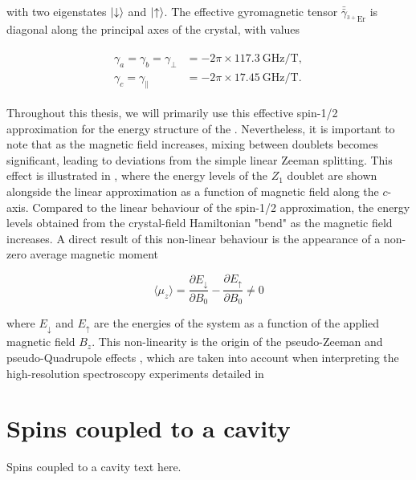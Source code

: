 with two eigenstates $\ket{\downarrow}$ and $\ket{\uparrow}$. The effective gyromagnetic tensor $\bar{\bar{\gamma}}_{^{3+}\text{Er}}$ is diagonal along the principal axes of the crystal, with values 

\begin{align}
\begin{split}
    \gamma_a = \gamma_b = \gamma_\perp &= -2\pi \times 117.3~\text{GHz/T}, \\
    \gamma_c = \gamma_\parallel &= -2\pi \times 17.45~\text{GHz/T}.
\end{split}
\end{align}

Throughout this thesis, we will primarily use this effective spin-1/2 approximation for the energy structure of the \Er. Nevertheless, it is important to note that as the magnetic field increases, mixing between doublets becomes significant, leading to deviations from the simple linear Zeeman splitting. This effect is illustrated in , where the energy levels of the $Z_1$ doublet are shown alongside the linear approximation as a function of magnetic field along the $c$-axis. Compared to the linear behaviour of the spin-1/2 approximation, the energy levels obtained from the crystal-field Hamiltonian "bend" as the magnetic field increases. A direct result of this non-linear behaviour is the appearance of a non-zero average magnetic moment

\begin{equation}
    \langle \mu_z \rangle = \frac{\partial E_\downarrow}{\partial B_0} - \frac{\partial E_\uparrow}{\partial B_0} \neq 0
\end{equation}

where $E_\downarrow$ and $E_\uparrow$ are the energies of the system as a function of the applied magnetic field $B_z$. This non-linearity is the origin of the pseudo-Zeeman  and pseudo-Quadrupole effects , which are taken into account when interpreting the high-resolution spectroscopy experiments detailed in 

\section{Spins coupled to a cavity}

Spins coupled to a cavity text here.